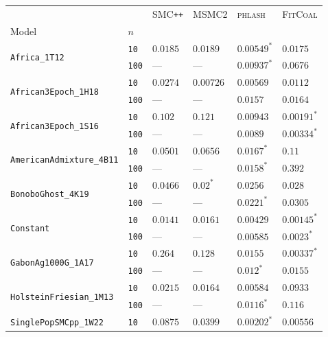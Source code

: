 \documentclass{article}
\begin{document}
\begin{footnotesize}
\begin{tabular}{llllll}
\toprule
 &  & \textsc{SMC}\texttt{{++}} & \textsc{MSMC2} & \textsc{phlash} & \textsc{FitCoal} \\
Model & $n$ &  &  &  &  \\
\midrule
\multirow[c]{2}{*}{\texttt{Africa\_1T12}} & \texttt{10} & $0.0185$ & $0.0189$ & $\mathbf{0.00549}^*$ & $0.0175$ \\
 & \texttt{100} & --- & --- & $\mathbf{0.00937}^*$ & $0.0676$ \\
\cline{1-6}
\multirow[c]{2}{*}{\texttt{African3Epoch\_1H18}} & \texttt{10} & $0.0274$ & $0.00726$ & $\mathbf{0.00569}$ & $0.0112$ \\
 & \texttt{100} & --- & --- & $\mathbf{0.0157}$ & $0.0164$ \\
\cline{1-6}
\multirow[c]{2}{*}{\texttt{African3Epoch\_1S16}} & \texttt{10} & $0.102$ & $0.121$ & $0.00943$ & $\mathbf{0.00191}^*$ \\
 & \texttt{100} & --- & --- & $0.0089$ & $\mathbf{0.00334}^*$ \\
\cline{1-6}
\multirow[c]{2}{*}{\texttt{AmericanAdmixture\_4B11}} & \texttt{10} & $0.0501$ & $0.0656$ & $\mathbf{0.0167}^*$ & $0.11$ \\
 & \texttt{100} & --- & --- & $\mathbf{0.0158}^*$ & $0.392$ \\
\cline{1-6}
\multirow[c]{2}{*}{\texttt{BonoboGhost\_4K19}} & \texttt{10} & $0.0466$ & $\mathbf{0.02}^*$ & $0.0256$ & $0.028$ \\
 & \texttt{100} & --- & --- & $\mathbf{0.0221}^*$ & $0.0305$ \\
\cline{1-6}
\multirow[c]{2}{*}{\texttt{Constant}} & \texttt{10} & $0.0141$ & $0.0161$ & $0.00429$ & $\mathbf{0.00145}^*$ \\
 & \texttt{100} & --- & --- & $0.00585$ & $\mathbf{0.0023}^*$ \\
\cline{1-6}
\multirow[c]{2}{*}{\texttt{GabonAg1000G\_1A17}} & \texttt{10} & $0.264$ & $0.128$ & $0.0155$ & $\mathbf{0.00337}^*$ \\
 & \texttt{100} & --- & --- & $\mathbf{0.012}^*$ & $0.0155$ \\
\cline{1-6}
\multirow[c]{2}{*}{\texttt{HolsteinFriesian\_1M13}} & \texttt{10} & $0.0215$ & $0.0164$ & $\mathbf{0.00584}$ & $0.0933$ \\
 & \texttt{100} & --- & --- & $\mathbf{0.0116}^*$ & $0.116$ \\
\cline{1-6}
\multirow[c]{2}{*}{\texttt{SinglePopSMCpp\_1W22}} & \texttt{10} & $0.0875$ & $0.0399$ & $\mathbf{0.00202}^*$ & $0.00556$ \\

\end{tabular}
\end{footnotesize}
\end{document}
